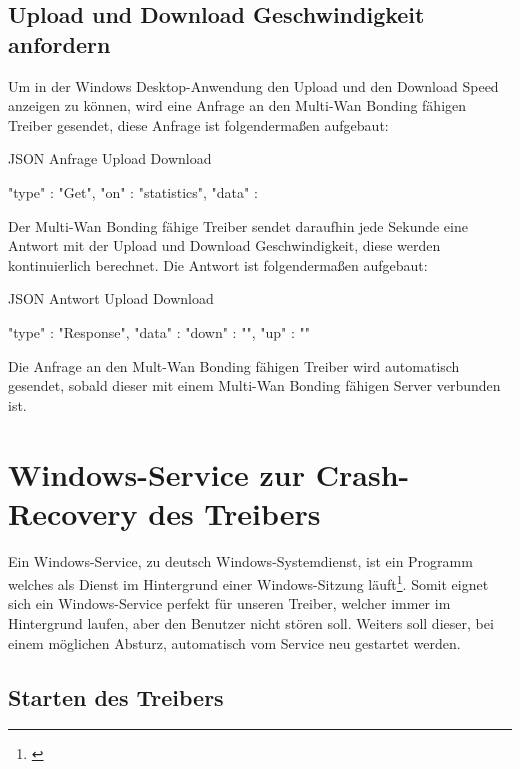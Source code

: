 \subsection{Upload und Download Geschwindigkeit anfordern}
Um in der Windows Desktop-Anwendung den Upload und den Download Speed anzeigen zu können, wird eine Anfrage an den Multi-Wan Bonding fähigen Treiber gesendet, diese Anfrage ist folgendermaßen aufgebaut:
\begin{program}[H]
\caption{JSON Anfrage Upload Download}
\begin{GenericCode}
    {
        "type" :  "Get",
        "on" :  "statistics",
        "data" : {} 
    }     
\end{GenericCode}
\end{program}
\noindent
Der Multi-Wan Bonding fähige Treiber sendet daraufhin jede Sekunde eine Antwort mit der Upload und Download Geschwindigkeit, diese werden kontinuierlich berechnet. Die Antwort ist folgendermaßen aufgebaut:
\begin{program}[H]
\caption{JSON Antwort Upload Download}
\begin{GenericCode}
    {
        "type" :  "Response",
        "data" : {
                    "down" : "",
                    "up" : ""
        } 
    }    
\end{GenericCode}
\end{program}
\noindent
Die Anfrage an den Mult-Wan Bonding fähigen Treiber wird automatisch gesendet, sobald dieser mit einem Multi-Wan Bonding fähigen Server verbunden ist. 

\lstset{basicstyle=\normalsize}

\pagebreak

\section{Windows-Service zur Crash-Recovery des Treibers}

Ein Windows-Service, zu deutsch Windows-Systemdienst, ist ein Programm welches als Dienst im Hintergrund einer Windows-Sitzung läuft\footnote[1]{\cite[Vgl.][]{WindowsService}}. Somit eignet sich ein Windows-Service perfekt für unseren Treiber, welcher immer im Hintergrund laufen, aber den Benutzer nicht stören soll. Weiters soll dieser, bei einem möglichen Absturz, automatisch vom Service neu gestartet werden.

\subsection{Starten des Treibers}

